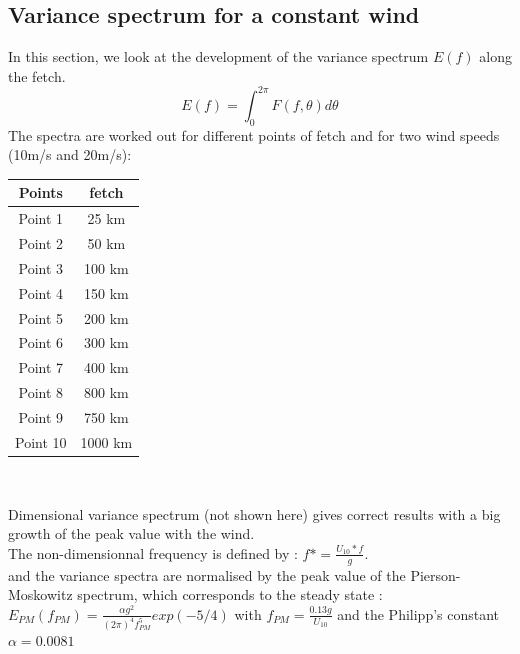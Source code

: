 \documentclass[10pt]{article}
\begin{document}
\subsection{Variance spectrum for a constant wind}
In this section, we look at the development of the variance spectrum $E(f)$ along the fetch.
\[ E(f) = \int_{0}^{2\pi} F(f,\theta )d\theta
\]
The spectra are worked out for different points of fetch and for two wind speeds (10m/s and 20m/s):\\
\begin{center}
\begin{tabular}{c|c}
Points & fetch\\
\hline
Point 1 & 25 km \\
Point 2 & 50 km \\
Point 3 & 100 km \\
Point 4 & 150 km \\
Point 5 & 200 km\\
Point 6 & 300 km \\
Point 7 & 400 km \\
Point 8 & 800 km\\
Point 9 & 750 km\\
Point 10 & 1000 km\\
\end{tabular}\\
\end{center}
Dimensional variance spectrum (not shown here) gives correct results with a big growth of the peak value with the wind.\\
The non-dimensionnal frequency is defined by : $f* = \frac{U_{10}*f}{g}$.\\
and the variance spectra are normalised by the peak value of the Pierson-Moskowitz spectrum, which corresponds to the steady state :\\
$E_{PM}(f_{PM}) = \frac{\alpha g^2}{(2\pi)^4 f_{PM}^5} exp(-5/4)$ with $f_{PM}=\frac{0.13 g}{U_{10}}$ and the Philipp's constant $\alpha = 0.0081$\\
\end{document}

